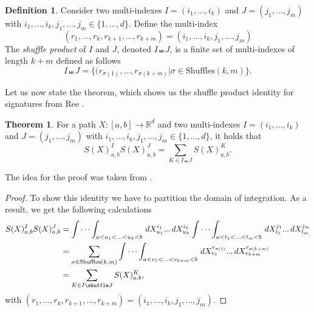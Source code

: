 \documentclass[12pt,a4paper]{report}
\theoremstyle{definition}
\newtheorem{theorem}{Theorem}
\newtheorem{definition}{Definition}
\begin{document}
\begin{definition}%
	Consider two multi-indexes $I=(i_1,...,i_k)$ and $J=(j_1,...,j_m)$ with $i_1,..., i_k, j_1,..., j_m \in \{1,...,d\}$. Define the multi-index
	\begin{equation}
		(r_1,...,r_k,r_{k+1},...,r_{k+m})=(i_1,..., i_k, j_1,..., j_m)
	\end{equation}
The \textit{shuffle product} of $I$ and $J$, denoted $I\shuffle J$, is a finite set of multi-indexes of length $k+m$ defined as follows
\begin{equation}
	I\shuffle J=\{(r_{\sigma(1)}, ...,r_{\sigma(k+m)}|\sigma \in \text{Shuffles}(k,m)\}.
\end{equation}
\end{definition}

Let us now state the theorem, which shows us the shuffle product identity for signatures from Ree \parencite{ree1958lie}.
\begin{theorem}
	For a path $X:[a,b]\rightarrow \mathbb{R}^d$ and two multi-indexes $I = (i_1, . . . , i_k)$ and $J = (j_1, . . . , j_m)$ with $i_1, . . . , i_k, j_1, . . . , j_m \in \{1, . . . , d\}$, it holds that
	\begin{equation}
		S(X)_{a,b}^I S(X)_{a,b}^J=\sum_{K\in I\shuffle J}S(X)_{a,b}^K.
	\end{equation}
\end{theorem}
The idea for the proof was taken from \parencite{fermanian2021learning}.
\begin{proof}
	To show this identity we have to partition the domain of integration. As a result, we get the following calculations
	\begin{equation}
		\begin{aligned}
			S(X)_{a,b}^I S(X)_{a,b}^J&=\idotsint_{a<u_1<...<u_k<b} \,dX_{u_1}^{i_1}...\,dX_{u_k}^{i_k} \idotsint_{a<t_1<...<t_m<b} \,dX_{t_1}^{j_1}...\,dX_{t_m}^{j_m}\\&= \sum_{\sigma \in \text{Shuffles}(k,m)}\idotsint_{a<v_1<...<v_{k+m}<b} \,dX_{v_1}^{r_{\sigma(1)}}...\,dX_{v_{k+m}}^{r_{\sigma(k+m)}}\\&= \sum_{K\in I\shuffle J}S(X)_{a,b}^K,
		\end{aligned}
	\end{equation}
with $(r_1,...,r_k,r_{k+1},...,r_{k+m})=(i_1,..., i_k, j_1,..., j_m)$.
\end{proof}
\end{document}
